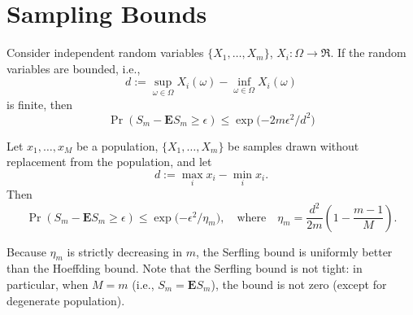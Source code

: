 \section{Sampling Bounds}

\begin{theorem}
  \label{thm:Hoeffding Bound} Consider independent random variables
  $\{X_{1},\ldots,X_{m}\}$, $X_{i}:\Omega\rightarrow\Re$. If the
  random variables are bounded, i.e.,
  \[
  d := \sup_{\omega\in\Omega}X_{i}(\omega) - \inf_{\omega\in\Omega}X_{i}(\omega)
  \] is finite, then
  \[
\Pr\left(S_{m}-\mathbf{E}S_{m}\geq\epsilon\right)\leq\exp\big({-2m\epsilon^{2}/d^{2}}\big)
  \]
\end{theorem}


\begin{theorem}
  \label{thm:Serfling Bound}
  Let $x_1,\ldots,x_{M}$ be a population, $\{X_{1},\ldots,X_{m}\}$ be
  samples drawn without replacement from the population, and let 
  $$ d
  := \max_i x_{i} - \min_i x_{i}.  
  $$ 
  Then
  \[
  \Pr\left(S_{m}-\mathbf{E} S_{m} \geq\epsilon\right)
  \leq\exp\big({-\epsilon^{2}/\eta_m}\big),
  \quad \text{where} \quad 
  \eta_{m} = \frac{d^{2}}{2m}\left(1 - \frac{m-1}{M} \right).
  \]
\end{theorem}


Because $\eta_m$ is strictly decreasing in $m$, the Serfling bound is
uniformly better than the Hoeffding bound. Note that the Serfling
bound is not tight: in particular, when $M=m$ (i.e., $S_{m} = \mathbf{E} S_{m}$), the
bound is not zero (except for degenerate population).  
